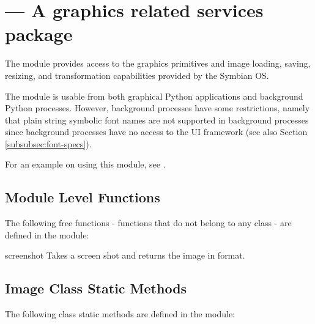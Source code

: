 %
%
%

\section{ ---
  A graphics related services package}
\label{sec:graphics}


The  module provides access to the graphics primitives and 
image loading, saving, resizing, and transformation capabilities provided by 
the Symbian OS. 

The module is usable from both graphical Python applications and
background Python processes. However, background processes have some
restrictions, namely that plain string symbolic font names are not
supported in background processes since background processes have no
access to the UI framework (see also Section
\ref{subsubsec:font-specs}).

For an example on using this module, see \cite{PyS60Prog}.

\subsection{Module Level Functions}
\label{subsec:mylabel7}
The following free functions - functions that do not belong to any class 
- are defined in the  module:

\begin{funcdesc}{screenshot}{}
Takes a screen shot and returns the image in  format.
\end{funcdesc}

\subsection{Image Class Static Methods}
\label{subsec:image}
The following  class static methods are defined in the 
 module:


